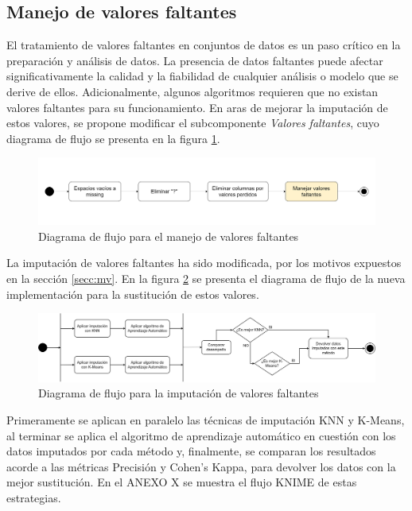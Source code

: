 \subsection{Manejo de valores faltantes}
El tratamiento de valores faltantes en conjuntos de datos es un paso crítico en la preparación y análisis de datos. La presencia de datos faltantes puede afectar significativamente la calidad y la fiabilidad de cualquier análisis o modelo que se derive de ellos. Adicionalmente, algunos algoritmos requieren que no existan valores faltantes para su funcionamiento. En aras de mejorar la imputación de estos valores, se propone modificar el subcomponente \textit{Valores faltantes}, cuyo diagrama de flujo se presenta en la figura \ref{fig:valores-faltantes}.

\begin{figure}[H]
	\centering
	\includegraphics[width=1\linewidth]{"figuras/capi 2/preprocesado/valores faltantes.drawio"}
	\caption{Diagrama de flujo para el manejo de valores faltantes}
	\label{fig:valores-faltantes}
\end{figure}

La imputación de valores faltantes ha sido modificada, por los motivos expuestos en la sección \ref{secc:mv}. En la figura \ref{fig:mv-imputation} se presenta el diagrama de flujo de la nueva implementación para la sustitución de estos valores. 

\begin{figure}[H]
	\centering
	\includegraphics[width=1\linewidth]{"figuras/capi 2/preprocesado/mv imputation.drawio"}
	\caption{Diagrama de flujo para la imputación de valores faltantes}
	\label{fig:mv-imputation}
\end{figure}

Primeramente se aplican en paralelo las técnicas de imputación KNN y K-Means, al terminar se aplica el algoritmo de aprendizaje automático en cuestión con los datos imputados por cada método y, finalmente, se comparan los resultados acorde a las métricas Precisión y Cohen's Kappa, para devolver los datos con la mejor sustitución. En el ANEXO X se muestra el flujo KNIME de estas estrategias. 

